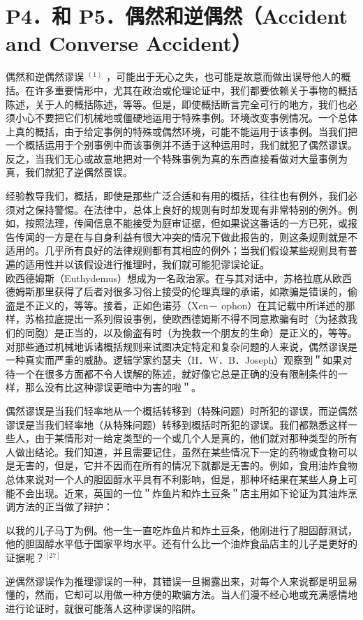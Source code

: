 \section*{P4．和 P5．偶然和逆偶然（Accident and Converse Accident）}
偶然和逆偶然谬误 ${ }^{(1)}$ ，可能出于无心之失，也可能是故意而做出误导他人的概括。在许多重要情形中，尤其在政治或伦理论证中，我们都要依赖关于事物的概括陈述，关于人的概括陈述，等等。但是，即使概括断言完全可行的地方，我们也必须小心不要把它们机械地或僵硬地运用于特殊事例。环境改变事例情况。一个总体上真的概括，由于给定事例的特殊或偶然环境，可能不能运用于该事例。当我们把一个概括运用于个别事例中而该事例并不适于这种运用时，我们就犯了偶然谬误。反之，当我们无心或故意地把对一个特殊事例为真的东西直接看做对大量事例为真，我们就犯了逆偶然䍚误。

经验教导我们，概括，即使是那些广泛合适和有用的概括，往往也有例外，我们必须对之保持警惕。在法律中，总体上良好的规则有时却发现有非常特别的例外。例如，按照法理，传闻信息不能接受为庭审证据，但如果说这番话的一方已死，或报告传闻的一方是在与自身利益有很大冲突的情况下做此报告的，则这条规则就是不适用的。几乎所有良好的法律规则都有其相应的例外；当我们假设某些规则具有普遍的适用性并以该假设进行推理时，我们就可能犯谬误论证。\\
欧西德姆斯（Euthydemus）想成为一名政治家。在与其对话中，苏格拉底从欧西德姆斯那里获得了后者对很多习俗上接受的伦理真理的承诺，如欺骗是错误的，偷盗是不正义的，等等。接着，正如色诺芬（Xen－ ophon）在其记载中所详述的那样，苏格拉底提出一系列假设事例，使欧西德姆斯不得不同意欺骗有时（为拯救我们的同胞）是正当的，以及偷盗有时（为挽救一个朋友的生命）是正义的，等等。对那些通过机械地诉诸概括规则来试图决定特定和复杂问题的人来说，偶然谬误是一种真实而严重的威胁。逻辑学家约瑟夫（H．W．B．Joseph）观察到＂如果对待一个在很多方面都不令人误解的陈述，就好像它总是正确的没有限制条件的一样，那么没有比这种谬误更暗中为害的啦＂。

偶然谬误是当我们轻率地从一个概括转移到（特殊问题）时所犯的谬误，而逆偶然谬误是当我们轻率地（从特殊问题）转移到概括时所犯的谬误。我们都熟悉这样一些人，由于某情形对一给定类型的一个或几个人是真的，他们就对那种类型的所有人做出结论。我们知道，并且需要记住，虽然在某些情况下一定的药物或食物可以是无害的，但是，它并不因而在所有的情况下就都是无害的。例如，食用油炸食物总体来说对一个人的胆固醇水平具有不利影响，但是，那种坏结果在某些人身上可能不会出现。近来，英国的一位＂炸鱼片和炸土豆条＂店主用如下论证为其油炸烹调方法的正当做了辩护：

\begin{displayquote}
以我的儿子马丁为例。他一生一直吃炸鱼片和炸土豆条，他刚进行了胆固醇测试，他的胆固醇水平低于国家平均水平。还有什么比一个油炸食品店主的儿子是更好的证据呢？${ }^{[27]}$
\end{displayquote}

逆偶然谬误作为推理谬误的一种，其错误一旦揭露出来，对每个人来说都是明显易懂的，然而，它却可以用做一种方便的欺骗方法。当人们漫不经心地或充满感情地进行论证时，就很可能落人这种谬误的陷阱。

